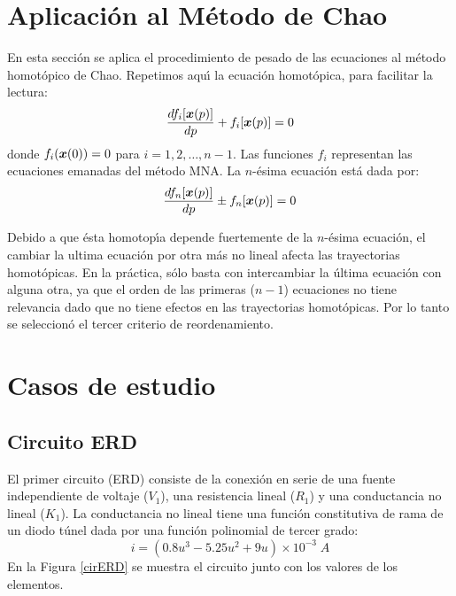 \documentclass[conference,letterpaper,onecolumn]{IEEEtran}
\newcommand{\pig}[1]{\mbox{\boldmath ${#1}$}	}
\begin{document}
\section{Aplicaci\'on al M\'etodo de Chao}
En esta secci\'on se aplica el procedimiento de pesado de las
ecuaciones al m\'etodo homot\'opico de Chao. Repetimos aqu\'{\i} la
ecuaci\'on homot\'opica, para facilitar la lectura:
\begin{equation}
{ {{d f_i[\pig{x}(p)]} \over{dp}} + f_i[\pig{x}(p)]=0}
\label{chaobis1}
\end{equation}
donde $f_i(\pig{x}(0))=0$ para $i=1,2,\ldots,n-1$. Las
funciones $f_i$ representan las ecuaciones emanadas del m\'etodo
MNA. La $n$-\'esima ecuaci\'on est\'a dada por:
\begin{equation}
{  {{d f_n [\pig{x}(p)]} \over {dp} } \pm f_n [\pig{x}(p)]=0}
\label{chaobis2}
\end{equation}


Debido a que \'esta homotop\'{\i}a depende fuertemente de la $n$-\'esima
ecuaci\'on, el cambiar la ultima ecuaci\'on por otra m\'as no lineal afecta
las trayectorias homot\'opicas.
En la pr\'actica, s\'olo basta con intercambiar la \'ultima ecuaci\'on
con alguna otra, ya que el orden de las primeras ($n-1$) ecuaciones no
tiene relevancia dado que no tiene efectos en las trayectorias
homot\'opicas. Por lo tanto se seleccion\'o el tercer criterio de reordenamiento.



\section{Casos de estudio}

\subsection{Circuito ERD}
El primer circuito  (ERD) consiste de la conexi\'on en serie de
una fuente independiente de voltaje ($V_1$),
una resistencia lineal ($R_1$) y
una conductancia no lineal ($K_1$). La conductancia no lineal tiene una funci\'on constitutiva de rama
de un diodo t\'unel dada por una funci\'on polinomial de tercer grado:
\begin{displaymath}
i = \left( 0.8u^3-5.25u^2+9u \right) \times 10^{-3} \;A
\end{displaymath}
En la Figura \ref{cirERD} se muestra el circuito junto con los
valores de los elementos.
\end{document}
